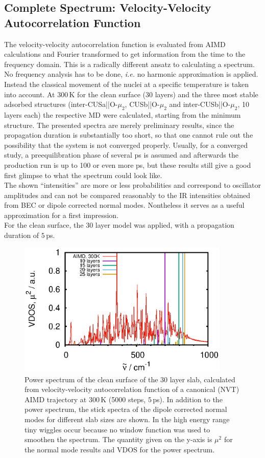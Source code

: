 \documentclass[11pt,DIV=13,BCOR=5mm,a4paper,headinclude]{scrbook}
\begin{document}
\subsection{Complete Spectrum: Velocity-Velocity Autocorrelation Function}\label{vvacf}
The velocity-velocity autocorrelation function is evaluated from AIMD calculations and Fourier transformed to get information from the time to the frequency domain.
This is a radically different ansatz to calculating a spectrum.
No frequency analysis has to be done, \textit{i.e.} no harmonic approximation is applied.
Instead the classical movement of the nuclei at a specific temperature is taken into account.
At $300\,$K for the clean surface (30 layers) and the three most stable adsorbed structures (inter-CUSa||O-$\mu_2$, CUSb||O-$\mu_2$ and inter-CUSb||O-$\mu_2$, 10 layers each) the respective MD were calculated, starting from the minimum structure.
The presented spectra are merely preliminary results, since the propagation duration is substantially too short, so that one cannot rule out the possibility that the system is not converged properly.
Usually, for a converged study, a preequilibration phase of several ps is assumed and afterwards the production run is up to 100 or even more ps, but these results still give a good first glimpse to what the spectrum could look like.
\\
The shown ``intensities'' are more or less probabilities and correspond to oscillator amplitudes and can not be compared reasonably to the IR intensities obtained from BEC or dipole corrected normal modes.
Nontheless it serves as a useful approximation for a first impression.
\\
For the clean surface, the 30 layer model was applied, with a propagation duration of $5\,$ps.
\begin{figure}[!h]
    \centering
    \includegraphics[width=0.9\textwidth]{figures/11-20/comp_cleansurf_all.eps}%
             \caption{Power spectrum of the clean surface of the 30 layer slab, calculated from velocity-velocity autocorrelation function of a canonical (NVT) AIMD trajectory at $300\,$K (5000 steps, $5\,$ps).
In addition to the power spectrum, the stick spectra of the dipole corrected normal modes for different slab sizes are shown.
In the high energy range tiny wiggles occur because no window function was used to smoothen the spectrum.
The quantity given on the y-axis is $\mu^2$ for the normal mode results and VDOS for the power spectrum.} \label{abb:velvelclean}
\end{figure}
\end{document}

